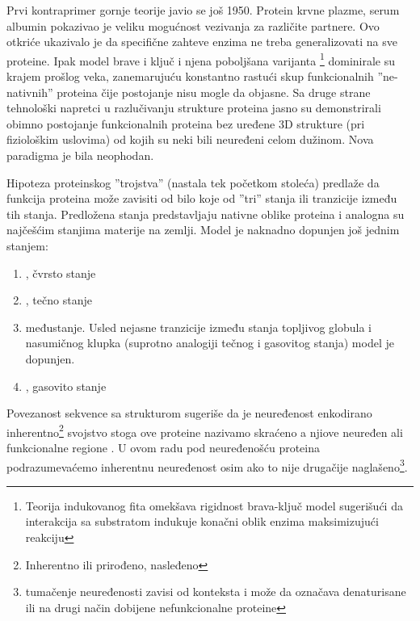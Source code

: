 Prvi kontraprimer gornje teorije javio se još 1950. Protein krvne plazme, serum
albumin pokazivao je veliku mogućnost vezivanja za različite
partnere\parencite{dunker2001}. Ovo otkriće ukazivalo je da specifične zahteve
enzima ne treba generalizovati na sve proteine. Ipak model brave i ključ i
njena poboljšana varijanta \footnote{ Teorija
indukovanog fita omekšava rigidnost brava-ključ model sugerišući da interakcija
sa substratom indukuje konačni oblik enzima maksimizujući
reakciju\parencite{biology}}  dominirale su krajem
prošlog veka, zanemarujuću konstantno rastući skup funkcionalnih
''ne-nativnih'' proteina čije postojanje nisu mogle da objasne. Sa druge strane
tehnološki napretci u razlučivanju strukture proteina jasno su demonstrirali
obimno postojanje funkcionalnih proteina bez uređene 3D strukture (pri
fiziološkim uslovima)  od kojih su neki bili neuređeni celom
dužinom\parencite{dunker2001}.  Nova paradigma je bila neophodan.

Hipoteza proteinskog ''trojstva''\parencite{dunker2001} (nastala tek početkom
stoleća) predlaže da funkcija proteina može zavisiti od bilo koje od ''tri''
stanja ili tranzicije između tih stanja. Predložena stanja predstavljaju
nativne oblike proteina i analogna su najčešćim stanjima materije na zemlji.
Model je naknadno dopunjen još jednim stanjem:
\begin{enumerate}
  \item {}, čvrsto stanje

  \item {} , tečno stanje

  \item {}  međustanje.
    Usled nejasne tranzicije između stanja topljivog globula i nasumičnog
    klupka (suprotno analogiji tečnog i gasovitog stanja)\parencite{dunker2001}
    model je dopunjen.

  \item {} , gasovito stanje
\end{enumerate}

Povezanost sekvence sa strukturom sugeriše da je neuređenost enkodirano
inherentno\footnote{ Inherentno ili prirođeno, nasleđeno} svojstvo \parencite{dunker2001}
stoga ove proteine nazivamo 
 skraćeno  a njiove neuređen
ali funkcionalne regione \parencite{uversky2016}. U ovom radu pod
neuređenošću proteina podrazumevaćemo inherentnu neuređenost osim ako to nije
drugačije naglašeno\footnote{ tumačenje neuređenosti zavisi od konteksta i može
  da označava denaturisane ili na drugi način dobijene nefunkcionalne
proteine}.


